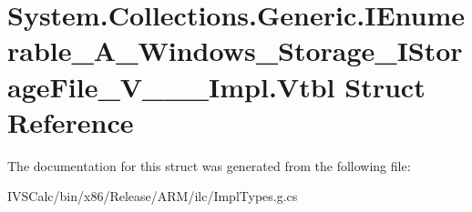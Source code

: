 \hypertarget{struct_system_1_1_collections_1_1_generic_1_1_i_enumerable___a___windows___storage___i_storage_file___v_______impl_1_1_vtbl}{}\section{System.\+Collections.\+Generic.\+I\+Enumerable\+\_\+\+A\+\_\+\+Windows\+\_\+\+Storage\+\_\+\+I\+Storage\+File\+\_\+\+V\+\_\+\+\_\+\+\_\+\+Impl.\+Vtbl Struct Reference}
\label{struct_system_1_1_collections_1_1_generic_1_1_i_enumerable___a___windows___storage___i_storage_file___v_______impl_1_1_vtbl}


The documentation for this struct was generated from the following file\+:\begin{DoxyCompactItemize}
\item 
I\+V\+S\+Calc/bin/x86/\+Release/\+A\+R\+M/ilc/Impl\+Types.\+g.\+cs\end{DoxyCompactItemize}
